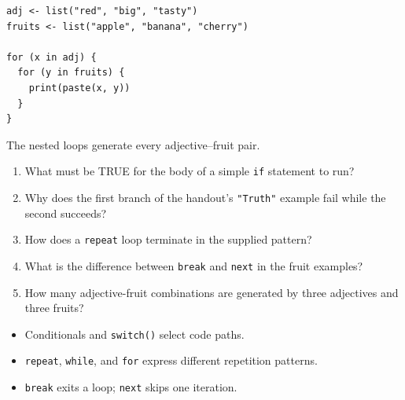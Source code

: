 \begin{lstlisting}[style=dsr]
adj <- list("red", "big", "tasty")
fruits <- list("apple", "banana", "cherry")

for (x in adj) {
  for (y in fruits) {
    print(paste(x, y))
  }
}
\end{lstlisting}

The nested loops generate every adjective--fruit pair.

\begin{quickcheck}
\begin{enumerate}
  \item What must be TRUE for the body of a simple \texttt{if} statement to run?
  \item Why does the first branch of the handout's \texttt{"Truth"} example fail while the second succeeds?
  \item How does a \texttt{repeat} loop terminate in the supplied pattern?
  \item What is the difference between \texttt{break} and \texttt{next} in the fruit examples?
  \item How many adjective-fruit combinations are generated by three adjectives and three fruits?
\end{enumerate}
\end{quickcheck}

\begin{chapterrecap}
\begin{itemize}
  \item Conditionals and \texttt{switch()} select code paths.
  \item \texttt{repeat}, \texttt{while}, and \texttt{for} express different repetition patterns.
  \item \texttt{break} exits a loop; \texttt{next} skips one iteration.
\end{itemize}
\end{chapterrecap}

